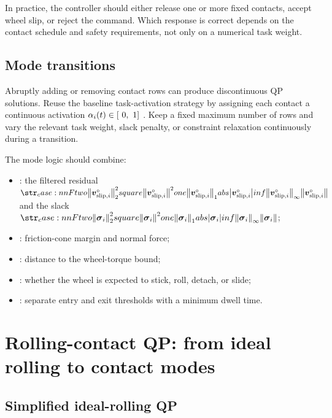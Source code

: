 \documentclass[10pt]{article}
\newcommand{\slipVelocity}[1]{\contactVel_{\text{slip},#1}}
\newcommand{\slackVariable}{\bs{\sigma}}
\begin{document}
In practice, the controller should either release one or more fixed contacts,
accept wheel slip, or reject the command. Which response is correct depends on
the contact schedule and safety requirements, not only on a numerical task
weight.

\subsection{Mode transitions}

Abruptly adding or removing contact rows can produce discontinuous QP
solutions. Reuse the baseline task-activation strategy by assigning each
contact a continuous activation $\alpha_i(t)\in[\ 0,~1 ]\ $. Keep a fixed
maximum number of rows and vary the relevant task weight, slack penalty, or
constraint relaxation continuously during a transition.

The mode logic should combine:
\begin{itemize}
  \item {}: the filtered residual
    $\norm{\measured{\slipVelocity{i}}}$ and the slack
    $\norm{\slackVariable_i}$;
  \item {}: friction-cone margin and normal force;
  \item {}: distance to the wheel-torque bound;
  \item {}: whether the wheel is expected to stick,
    roll, detach, or slide;
  \item {}: separate entry and exit thresholds with a
    minimum dwell time.
\end{itemize}

\section{Rolling-contact QP: from ideal rolling to contact modes}
\label{sec:rolling-qp}

\subsection{Simplified ideal-rolling QP}
\end{document}
